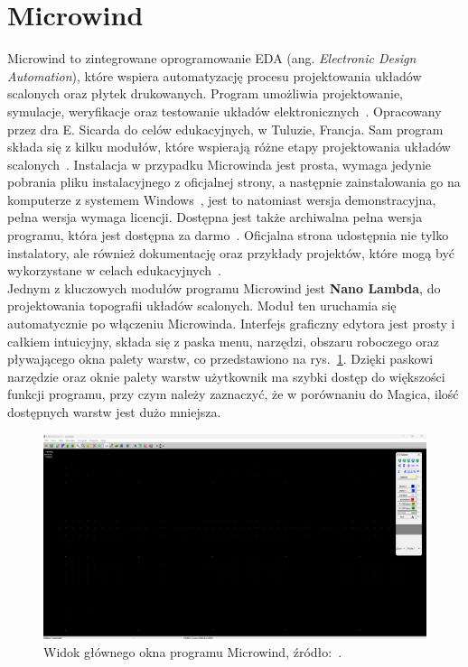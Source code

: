 \section{Microwind}

Microwind to zintegrowane oprogramowanie EDA (ang. \textit{Electronic Design Automation}),
które wspiera automatyzację procesu projektowania układów scalonych oraz płytek drukowanych.
Program umożliwia projektowanie, symulacje, weryfikacje oraz testowanie układów elektronicznych~\cite{eda}.
Opracowany przez dra E. Sicarda do celów edukacyjnych,
w Tuluzie, Francja.
Sam program składa się z kilku modułów,
które wspierają różne etapy projektowania układów scalonych~\cite{Microwind}.
Instalacja w przypadku Microwinda jest prosta, wymaga jedynie pobrania pliku instalacyjnego z oficjalnej strony,
a następnie zainstalowania go na komputerze z systemem Windows~\cite{Microwind},
jest to natomiast wersja demonstracyjna, pełna wersja wymaga licencji.
Dostępna jest także archiwalna pełna wersja programu, która jest dostępna za darmo~\cite{old_microwind}.
Oficjalna strona udostępnia nie tylko instalatory, ale również dokumentację oraz przykłady projektów,
które mogą być wykorzystane w celach edukacyjnych~\cite{Microwind}.\\
\indent Jednym z kluczowych modułów programu Microwind jest \textbf{Nano Lambda},
do projektowania topografii układów scalonych.
Moduł ten uruchamia się automatycznie po włączeniu Microwinda.
Interfejs graficzny edytora jest prosty i całkiem intuicyjny,
składa się z paska menu, narzędzi, obszaru roboczego oraz pływającego okna palety warstw,
co przedstawiono na rys.~\ref{fig:microwind_okno}.
Dzięki paskowi narzędzie oraz oknie palety warstw użytkownik ma szybki dostęp do większości funkcji programu,
przy czym należy zaznaczyć, że w porównaniu do Magica, ilość dostępnych warstw jest dużo mniejsza.

\begin{figure}[h]
    \centering
    \includegraphics[width=.9\textwidth]{chapters/chapter2/img/microwind_okno}
    \caption[Widok głównego okna programu Microwind.]{Widok głównego okna programu Microwind, źródło:~\cite{Microwind}.}
    \label{fig:microwind_okno}
\end{figure}

